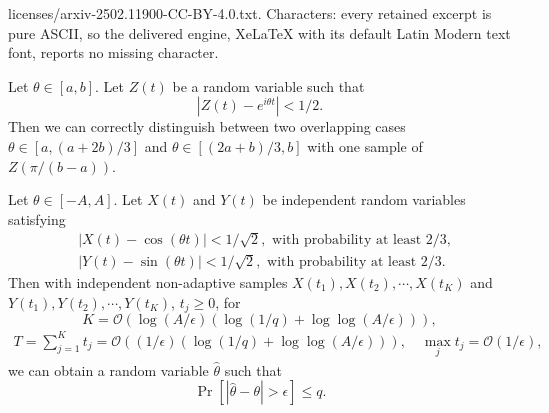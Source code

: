 \documentclass[10pt,a4paper]{amsart}
\begin{document}
licenses/arxiv-2502.11900-CC-BY-4.0.txt. Characters: every retained excerpt is pure ASCII, so the delivered engine, XeLaTeX with its default Latin Modern text font, reports no missing character.
\begin{lemma}
    \label{lem:frequency_est_refine}
    Let $\theta\in[a,b]$.
    Let $Z(t)$ be a random variable such that 
    \begin{equation}
        \label{eq:rv_correctness_condition}
        |Z(t)-e^{i\theta t}|< 1/2.
    \end{equation}
    Then we can correctly distinguish between two overlapping cases $\theta\in[a,(a+2b)/3]$ and $\theta\in[(2a+b)/3,b]$ with one sample of $Z(\pi/(b-a))$. 
\end{lemma}

\begin{theorem*}
    Let $\theta\in[-A,A]$.
    Let $X(t)$ and $Y(t)$ be independent random variables satisfying
    \begin{equation}
        \label{eq:rv_correctness_condition_prob}
        \begin{aligned}
            &|X(t)-\cos(\theta t)|< 1/\sqrt{2}, \text{ with probability at least }2/3, \\
            &|Y(t)-\sin(\theta t)|< 1/\sqrt{2}, \text{ with probability at least }2/3.
        \end{aligned}
    \end{equation}
    Then with independent non-adaptive samples $X(t_1),X(t_2),\cdots,X(t_K)$ and $Y(t_1),Y(t_2),\cdots,Y(t_K)$, $t_j\geq 0$, for
    \begin{equation}
        \label{eq:number_of_samples_RPE}
        K=\mathcal{O}(\log(A/\epsilon)(\log(1/q)+\log\log(A/\epsilon))),
    \end{equation}
    \begin{equation}
    \label{eq:total_evolution_time_RPE}
    \begin{aligned}
        T=\sum_{j=1}^Kt_j=\mathcal{O}((1/\epsilon)(\log(1/q)+\log\log(A/\epsilon))),\quad \max_j t_j=\mathcal{O}(1/\epsilon),
    \end{aligned}
    \end{equation}
    we can obtain a random variable $\hat{\theta}$ such that
    \begin{equation}
        \Pr[|\hat{\theta}-\theta|>\epsilon]\leq q.
    \end{equation}
\end{theorem*}
\end{document}
